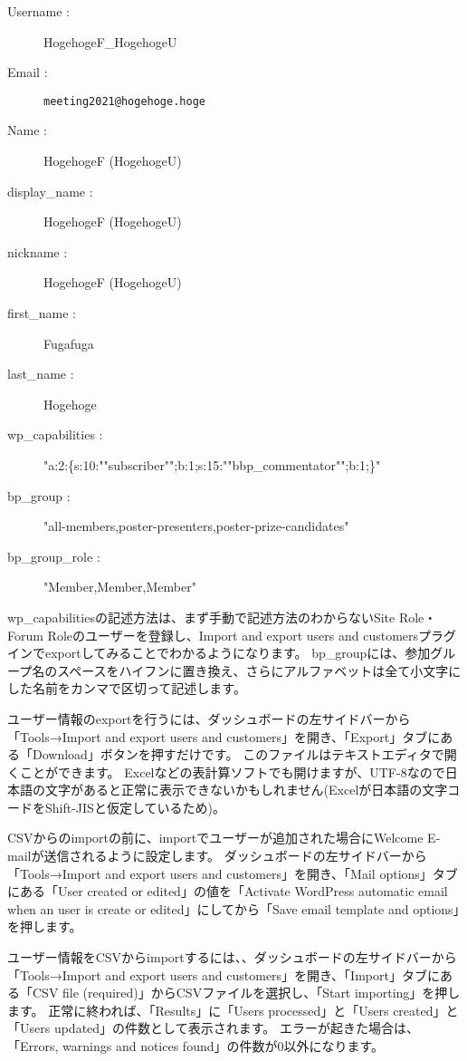 \documentclass[titlepage,10pt,a4paper,uplatex]{jsbook}
\begin{document}
\begin{description}
\item[Username : ] HogehogeF\_HogehogeU
\item[Email : ] \texttt{meeting2021@hogehoge.hoge}
\item[Name : ] HogehogeF (HogehogeU)
\item[display\_name : ] HogehogeF (HogehogeU)
\item[nickname : ] HogehogeF (HogehogeU)
\item[first\_name : ] Fugafuga
\item[last\_name : ] Hogehoge
\item[wp\_capabilities : ] "a:2:\{s:10:""subscriber"";b:1;s:15:""bbp\_commentator"";b:1;\}"
\item[bp\_group : ] "all-members,poster-presenters,poster-prize-candidates"
\item[bp\_group\_role : ] "Member,Member,Member"
\end{description}

wp\_capabilitiesの記述方法は、まず手動で記述方法のわからないSite Role・Forum Roleのユーザーを登録し、Import and export users and customersプラグインでexportしてみることでわかるようになります。
bp\_groupには、参加グループ名のスペースをハイフンに置き換え、さらにアルファベットは全て小文字にした名前をカンマで区切って記述します。

ユーザー情報のexportを行うには、ダッシュボードの左サイドバーから「Tools→Import and export users and customers」を開き、「Export」タブにある「Download」ボタンを押すだけです。
このファイルはテキストエディタで開くことができます。
Excelなどの表計算ソフトでも開けますが、UTF-8なので日本語の文字があると正常に表示できないかもしれません(Excelが日本語の文字コードをShift-JISと仮定しているため)。

CSVからのimportの前に、importでユーザーが追加された場合にWelcome E-mailが送信されるように設定します。
ダッシュボードの左サイドバーから「Tools→Import and export users and customers」を開き、「Mail options」タブにある「User created or edited」の値を「Activate WordPress automatic email when an user is create or edited」にしてから「Save email template and options」を押します。

ユーザー情報をCSVからimportするには、、ダッシュボードの左サイドバーから「Tools→Import and export users and customers」を開き、「Import」タブにある「CSV file (required)」からCSVファイルを選択し、「Start importing」を押します。
正常に終われば、「Results」に「Users processed」と「Users created」と「Users updated」の件数として表示されます。
エラーが起きた場合は、「Errors, warnings and notices found」の件数が0以外になります。
\end{document}
